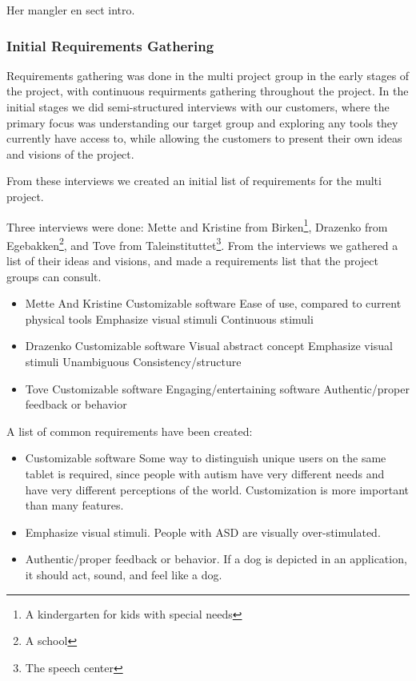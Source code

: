 Her mangler en sect intro.
\subsubsection*{Initial Requirements Gathering}
Requirements gathering was done in the multi project group in the early stages of the project, with continuous requirments gathering throughout the project.
In the initial stages we did semi-structured interviews with our customers, where the primary focus was understanding our target group and exploring any tools they currently have access to, while allowing the customers to present their own ideas and visions of the project.

From these interviews we created an initial list of requirements for the multi project.

Three interviews were done: Mette and Kristine from Birken\footnote{A kindergarten for kids with special needs}, Drazenko from Egebakken\footnote{A school}, and Tove from Taleinstituttet\footnote{The speech center}.
From the interviews we gathered a list of their ideas and visions, and made a requirements list that the project groups can consult.

\begin{itemize}
 \item Mette And Kristine 
  \subitem Customizable software
  \subitem Ease of use, compared to current physical tools
  \subitem Emphasize visual stimuli
  \subitem Continuous stimuli 
 \item Drazenko
  \subitem Customizable software
  \subitem Visual abstract concept
  \subitem Emphasize visual stimuli
  \subitem Unambiguous
  \subitem Consistency/structure
 \item Tove 
  \subitem Customizable software
  \subitem Engaging/entertaining software
  \subitem Authentic/proper feedback or behavior
\end{itemize}

A list of common requirements have been created:

\begin{itemize}
 \item Customizable software
  \subitem Some way to distinguish unique users on the same tablet is required, since people with autism have very different needs and have very different perceptions of the world.
  \subitem Customization is more important than many features.
 \item Emphasize visual stimuli.
  \subitem People with ASD are visually over-stimulated.
 \item Authentic/proper feedback or behavior.
  \subitem If a dog is depicted in an application, it should act, sound, and feel like a dog.
\end{itemize}


